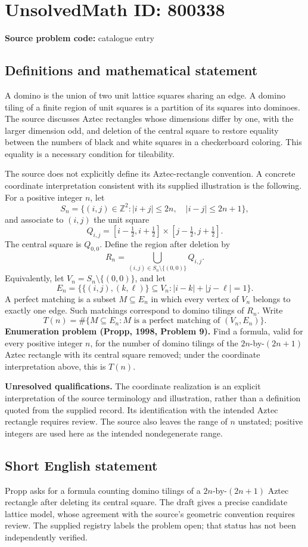 \documentclass[11pt]{article}
\newcommand{\Z}{\mathbb{Z}}
\begin{document}
\section*{UnsolvedMath ID: 800338}
\textbf{Source problem code:} catalogue entry
\subsection{Definitions and mathematical statement}
A domino is the union of two unit lattice squares sharing an edge. A domino tiling of a finite region of unit squares is a partition of its squares into dominoes. The source discusses Aztec rectangles whose dimensions differ by one, with the larger dimension odd, and deletion of the central square to restore equality between the numbers of black and white squares in a checkerboard coloring. This equality is a necessary condition for tileability.

The source does not explicitly define its Aztec-rectangle convention. A concrete coordinate interpretation consistent with its supplied illustration is the following. For a positive integer \(n\), let
\[
S_n=\bigl\{(i,j)\in\Z^2: |i+j|\leq 2n,\quad |i-j|\leq 2n+1\bigr\},
\]
and associate to \((i,j)\) the unit square
\[
Q_{i,j}=[i-\tfrac12,i+\tfrac12]\times[j-\tfrac12,j+\tfrac12].
\]
The central square is \(Q_{0,0}\). Define the region after deletion by
\[
R_n=\bigcup_{(i,j)\in S_n\setminus\{(0,0)\}}Q_{i,j}.
\]
Equivalently, let \(V_n=S_n\setminus\{(0,0)\}\), and let
\[
E_n=\bigl\{\{(i,j),(k,\ell)\}\subseteq V_n:
|i-k|+|j-\ell|=1\bigr\}.
\]
A perfect matching is a subset \(M\subseteq E_n\) in which every vertex of \(V_n\) belongs to exactly one edge. Such matchings correspond to domino tilings of \(R_n\). Write
\[
T(n)=\#\bigl\{M\subseteq E_n:M\text{ is a perfect matching of }(V_n,E_n)\bigr\}.
\]
\textbf{Enumeration problem (Propp, 1998, Problem 9).} Find a formula, valid for every positive integer \(n\), for the number of domino tilings of the \(2n\)-by-\((2n+1)\) Aztec rectangle with its central square removed; under the coordinate interpretation above, this is \(T(n)\).

\textbf{Unresolved qualifications.} The coordinate realization is an explicit interpretation of the source terminology and illustration, rather than a definition quoted from the supplied record. Its identification with the intended Aztec rectangle requires review. The source also leaves the range of \(n\) unstated; positive integers are used here as the intended nondegenerate range.
\subsection{Short English statement}
Propp asks for a formula counting domino tilings of a \(2n\)-by-\((2n+1)\) Aztec rectangle after deleting its central square. The draft gives a precise candidate lattice model, whose agreement with the source's geometric convention requires review. The supplied registry labels the problem open; that status has not been independently verified.
\end{document}
